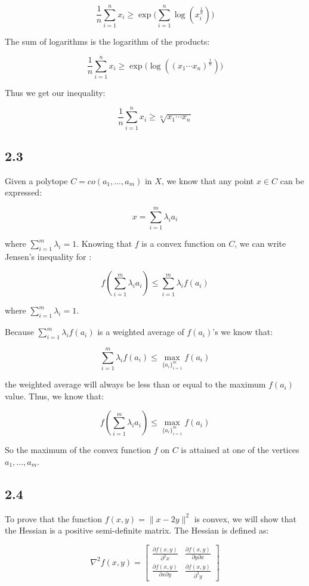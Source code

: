\documentclass[12pt]{article}
\begin{document}
\[\frac{1}{n}\sum_{i=1}^n x_i \geq \exp \bigg(\sum_{i=1}^n \log(x_i^{\frac{1}{n}}) \bigg)\]

The sum of logarithms is the logarithm of the products:

\[\frac{1}{n}\sum_{i=1}^n x_i \geq \exp \bigg(\log((x_1 \cdots x_n )^{\frac{1}{n}})\bigg)\]

Thus we get our inequality:

\[\frac{1}{n}\sum_{i=1}^n x_i \geq \sqrt[n]{x_1 \cdots x_n}\] \square
\subsection*{2.3}

Given a polytope $C=co(a_1, ..., a_m)$ in $X$, we know that any point $x \in C$ can be expressed:

\[x = \sum_{i=1}^{m} \lambda_i a_i \]

where $\sum_{i=1}^{m} \lambda_i = 1$. Knowing that $f$ is a convex function on $C$, we can write Jensen's inequality for :

\[f\left(\sum_{i=1}^{m} \lambda_i a_i \right) \leq \sum_{i=1}^{m} \lambda_i f(a_i)\]

where $\sum_{i=1}^{m} \lambda_i = 1$.

Because $\sum_{i=1}^{m} \lambda_i f(a_i)$ is a weighted average of $f(a_i)$'s we know that:

\[\sum_{i=1}^{m} \lambda_i f(a_i) \leq \max_{\{a_i\}_{i=1}^m} f(a_i)\]

the weighted average will always be less than or equal to the maximum $f(a_i)$ value. Thus, we know that:

\[f\left(\sum_{i=1}^{m} \lambda_i a_i \right) \leq \max_{\{a_i\}_{i=1}^m} f(a_i)\]

So the maximum of the convex function $f$ on $C$ is attained at one of the vertices $a_1, ..., a_m$.
\square

\subsection*{2.4}

To prove that the function $f(x, y) = \| x-2y\|^2$ is convex, we will show that the Hessian is a positive semi-definite matrix. The Hessian is defined as:


\[
\nabla^2 f(x, y) = \begin{bmatrix}
                 \frac{\partial f(x, y)}{\partial^2 x} & \frac{\partial f(x, y)}{\partial y \partial x}\\
                 \frac{\partial f(x, y)}{\partial x \partial y} & \frac{\partial f(x, y)}{\partial^2 y}
         \end{bmatrix}
\]
\end{document}

